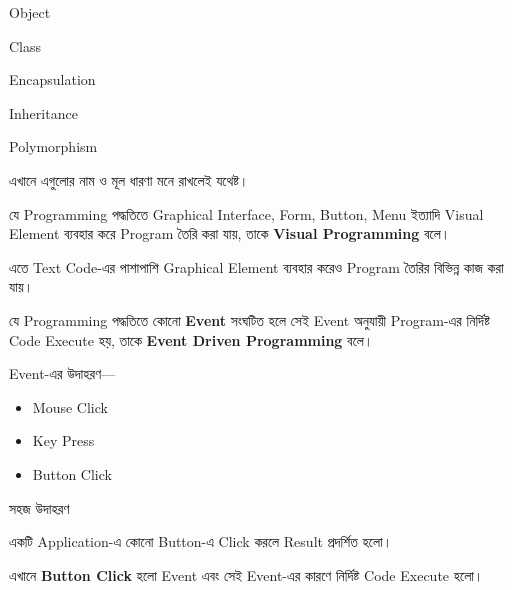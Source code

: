 \begin{compacttwocolpoints}

\item Object
\item Class
\item Encapsulation
\item Inheritance
\item Polymorphism

\end{compacttwocolpoints}

এখানে এগুলোর নাম ও মূল ধারণা মনে রাখলেই যথেষ্ট।


যে Programming পদ্ধতিতে Graphical Interface, Form, Button,
Menu ইত্যাদি Visual Element ব্যবহার করে Program তৈরি করা যায়,
তাকে \textbf{Visual Programming} বলে।

এতে Text Code-এর পাশাপাশি Graphical Element ব্যবহার করেও
Program তৈরির বিভিন্ন কাজ করা যায়।


যে Programming পদ্ধতিতে কোনো \textbf{Event} সংঘটিত হলে
সেই Event অনুযায়ী Program-এর নির্দিষ্ট Code Execute হয়,
তাকে \textbf{Event Driven Programming} বলে।

Event-এর উদাহরণ—

\begin{itemize}

\item Mouse Click
\item Key Press
\item Button Click

\end{itemize}

\begin{examplebox}{সহজ উদাহরণ}

একটি Application-এ কোনো Button-এ Click করলে Result প্রদর্শিত হলো।

এখানে \textbf{Button Click} হলো Event এবং সেই Event-এর কারণে
নির্দিষ্ট Code Execute হলো।

\end{examplebox}



